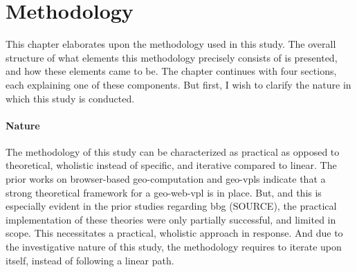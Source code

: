 \chapter{Methodology}
\label{chap:methodology}

This chapter elaborates upon the methodology used in this study. 
The overall structure of what elements this methodology precisely consists of is presented, and how these elements came to be. 
The chapter continues with four sections, each explaining one of these components.
But first, I wish to clarify the nature in which this study is conducted. 

\subsubsection*{Nature}
The methodology of this study can be characterized as practical as opposed to theoretical, wholistic instead of specific, and iterative compared to linear. The prior works on browser-based geo-computation and geo-vpls indicate that a strong theoretical framework for a \ac{geo-web-vpl} is in place. 
But, and this is especially evident in the prior studies regarding \ac{bbg} (SOURCE), the practical implementation of these theories were only partially successful, and limited in scope. 
This necessitates a practical, wholistic approach in response. 
And due to the investigative nature of this study, the methodology requires to iterate upon itself, instead of following a linear path. 



